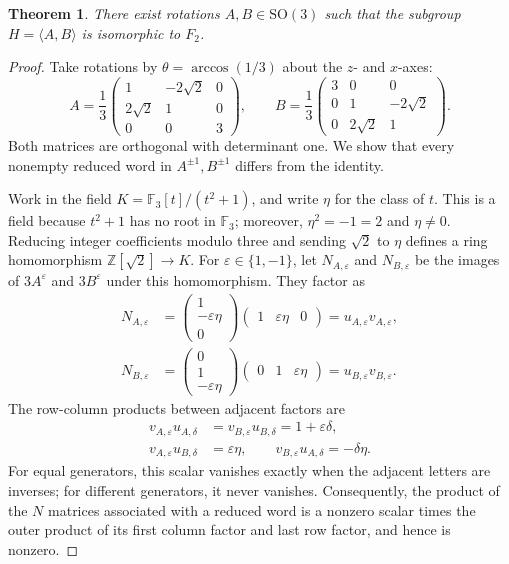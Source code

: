 \documentclass[12pt,a4paper]{article}
\theoremstyle{spaced}
\newtheorem{theorem}{Theorem}[section]
\begin{document}
\begin{theorem}\label{thm:free_subgroup_SO3-updated}
	There exist rotations $A,B\in \mathrm{SO}(3)$ such that the subgroup
	\(
	H = \langle A,B\rangle
	\)
	is isomorphic to $F_{2}$.
\end{theorem}
\begin{proof}
	Take rotations by $\theta=\arccos(1/3)$ about the $z$- and $x$-axes:
	\[
		A=\frac13\begin{pmatrix}
		1&-2\sqrt2&0\\2\sqrt2&1&0\\0&0&3
		\end{pmatrix},
		\qquad
		B=\frac13\begin{pmatrix}
		3&0&0\\0&1&-2\sqrt2\\0&2\sqrt2&1
		\end{pmatrix}.
	\]
	Both matrices are orthogonal with determinant one. We show that every
	nonempty reduced word in $A^{\pm1},B^{\pm1}$ differs from the identity.

	Work in the field
	$K=\mathbb F_3[t]/(t^2+1)$, and write $\eta$ for the class of $t$.
	This is a field because $t^2+1$ has no root in $\mathbb F_3$;
	moreover, $\eta^2=-1=2$ and $\eta\ne0$.
	Reducing integer coefficients modulo three and sending $\sqrt2$ to $\eta$
	defines a ring homomorphism $\mathbb Z[\sqrt2]\to K$.
	For $\varepsilon\in\{1,-1\}$, let $N_{A,\varepsilon}$ and
	$N_{B,\varepsilon}$ be the images of $3A^\varepsilon$ and
	$3B^\varepsilon$ under this homomorphism. They factor as
	\[
	\begin{aligned}
		N_{A,\varepsilon}
		&=\begin{pmatrix}1\\-\varepsilon\eta\\0\end{pmatrix}
		  \begin{pmatrix}1&\varepsilon\eta&0\end{pmatrix}
		  =u_{A,\varepsilon}v_{A,\varepsilon},\\
		N_{B,\varepsilon}
		&=\begin{pmatrix}0\\1\\-\varepsilon\eta\end{pmatrix}
		  \begin{pmatrix}0&1&\varepsilon\eta\end{pmatrix}
		  =u_{B,\varepsilon}v_{B,\varepsilon}.
	\end{aligned}
	\]
	The row-column products between adjacent factors are
	\[
	\begin{aligned}
		v_{A,\varepsilon}u_{A,\delta}
		 &=v_{B,\varepsilon}u_{B,\delta}=1+\varepsilon\delta,\\
		v_{A,\varepsilon}u_{B,\delta}&=\varepsilon\eta,
		\qquad v_{B,\varepsilon}u_{A,\delta}=-\delta\eta.
	\end{aligned}
	\]
	For equal generators, this scalar vanishes exactly when the adjacent
	letters are inverses; for different generators, it never vanishes.
	Consequently, the product of the $N$ matrices associated with a reduced
	word is a nonzero scalar times the outer product of its first column
	factor and last row factor, and hence is nonzero.


\end{proof}
\end{document}
